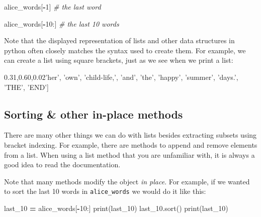 \documentclass[]{book}
\newenvironment{Shaded}{\begin{snugshade}}{\end{snugshade}}
\newcommand{\DecValTok}[1]{\textcolor[rgb]{0.00,0.00,0.81}{#1}}
\newcommand{\StringTok}[1]{\textcolor[rgb]{0.31,0.60,0.02}{#1}}
\newcommand{\CommentTok}[1]{\textcolor[rgb]{0.56,0.35,0.01}{\textit{#1}}}
\newcommand{\OperatorTok}[1]{\textcolor[rgb]{0.81,0.36,0.00}{\textbf{#1}}}
\newcommand{\BuiltInTok}[1]{#1}
\newcommand{\NormalTok}[1]{#1}
\begin{document}
\begin{Shaded}
\begin{Highlighting}[]
\NormalTok{alice_words[}\OperatorTok{-}\DecValTok{1}\NormalTok{] }\CommentTok{# the last word}
\end{Highlighting}
\end{Shaded}

\begin{Shaded}
\begin{Highlighting}[]
\NormalTok{alice_words[}\OperatorTok{-}\DecValTok{10}\NormalTok{:] }\CommentTok{# the last 10 words}
\end{Highlighting}
\end{Shaded}

Note that the displayed representation of lists and other data
structures in python often closely matches the syntax used to create
them. For example, we can create a list using square brackets, just as
we see when we print a list:

\begin{Shaded}
\begin{Highlighting}[]
\NormalTok{[}\StringTok{'her'}\NormalTok{,}
 \StringTok{'own'}\NormalTok{,}
 \StringTok{'child-life,'}\NormalTok{,}
 \StringTok{'and'}\NormalTok{,}
 \StringTok{'the'}\NormalTok{,}
 \StringTok{'happy'}\NormalTok{,}
 \StringTok{'summer'}\NormalTok{,}
 \StringTok{'days.'}\NormalTok{,}
 \StringTok{'THE'}\NormalTok{,}
 \StringTok{'END'}\NormalTok{]}
\end{Highlighting}
\end{Shaded}

\subsection{Sorting \& other in-place
methods}\label{sorting-other-in-place-methods}

There are many other things we can do with lists besides extracting
subsets using bracket indexing. For example, there are methods to append
and remove elements from a list. When using a list method that you are
unfamiliar with, it is always a good idea to read the documentation.

Note that many methods modify the object \emph{in place}. For example,
if we wanted to sort the last 10 words in \texttt{alice\_words} we would
do it like this:

\begin{Shaded}
\begin{Highlighting}[]
\NormalTok{last_10 }\OperatorTok{=}\NormalTok{ alice_words[}\OperatorTok{-}\DecValTok{10}\NormalTok{:]}
\BuiltInTok{print}\NormalTok{(last_10)}
\NormalTok{last_10.sort()}
\BuiltInTok{print}\NormalTok{(last_10)}
\end{Highlighting}
\end{Shaded}
\end{document}
